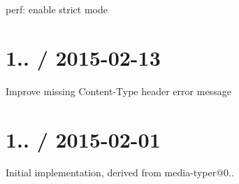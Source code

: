 
\begin{DoxyItemize}
\item perf\+: enable strict mode
\end{DoxyItemize}

\section*{1.. / 2015-\/02-\/13 }


\begin{DoxyItemize}
\item Improve missing {\ttfamily Content-\/\+Type} header error message
\end{DoxyItemize}

\section*{1.. / 2015-\/02-\/01 }


\begin{DoxyItemize}
\item Initial implementation, derived from {\ttfamily media-\/typer@0..} 
\end{DoxyItemize}